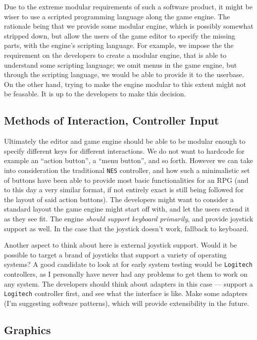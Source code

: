 Due to the extreme modular requirements of such a software product, it might be
wiser to use a scripted programming language along the game engine. The rationale
being that we provide some modular engine, which is possibly somewhat stripped
down, but allow the users of the game editor to specify the missing parts, with
the engine's scripting language. For example, we impose the the requirement on
the developers to create a modular engine, that is able to understand some
scripting language; we omit menus in the game engine, but through the scripting
language, we would be able to provide it to the userbase. On the other hand,
trying to make the engine modular to this extent might not be feasable. It is up
to the developers to make this decision.

\subsection{Methods of Interaction, Controller Input}

Ultimately the editor and game engine should be able to be modular enough to
specify different keys for different interactions. We do not want to hardcode
for example an ``action button'', a ``menu button'', and so forth. However we
can take into consideration the traditional \texttt{NES} controller, and how
such a minimalistic set of buttons have been able to provide most basic
functionalities for an RPG (and to this day a very similar format, if not
entirely exact is still being followed for the layout of said action buttons).
The developers might want to consider a standard layout the game engine might
start off with, and let the users extend it as they see fit. The engine
\textit{should support keyboard primarily}, and provide joystick support as
well. In the case that the joystick doesn't work, fallback to keyboard.

Another aspect to think about here is external joystick support. Would it be
possible to target a brand of joysticks that support a variety of operating
systems? A good candidate to look at for early system testing would be
\texttt{Logitech} controllers, as I personally have never had any problems to
get them to work on any system. The developers should think about adapters in
this case --- support a \texttt{Logitech} controller first, and see what the
interface is like. Make some adapters (I'm suggesting software patterns), which
will provide extensibility in the future.

\subsection{Graphics}

